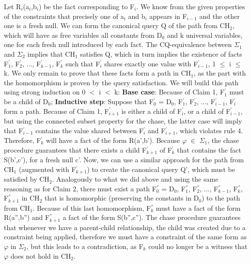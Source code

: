 \documentclass[11pt, a4paper, dvipsnames]{article}
\begin{document}
Let R$_{i}$(a$_{i}$,b$_{i}$) be the fact corresponding to F$_{i}$. We know from the given properties of the constraints that precisely one of a$_{i}$ and b$_{i}$ appears in F$_{i-1}$ and the other one is a fresh null. We can form the canonical query Q of the path from CH$_{2}$, which will have as free variables all constants from D$_{0}$ and k universal variables, one for each fresh null introduced by each fact. The CQ-equivalence between $\Sigma_{1}$ and $\Sigma_{2}$ implies that CH$_{1}$ satisfies Q, which in turn implies the existence of facts F$^{'}_{1}$, F$^{'}_{2}$, ..., F$^{'}_{k-1}$, F$^{'}_{k}$ such that F$^{'}_{i}$ shares exactly one value with F$^{'}_{i-1}$, 1 $\leq$ i $\leq$ k. We only remain to prove that these facts form a path in CH$_{1}$, as the part with the homomorphism is proven by the query satisfaction. We will build this path using strong induction on 0 $<$ i $<$ k:\newline
\textbf{Base case}: Because of Claim 1, F$^{'}_{1}$ must be a child of D$_{0}$;\newline
\textbf{Inductive step}: Suppose that F$^{'}_{0}$ = D$_{0}$, F$^{'}_{1}$, F$^{'}_{2}$, ..., F$^{'}_{i-1}$, F$^{'}_{i}$ form a path. Because of Claim 1, F$^{'}_{i+1}$ is either a child of F$^{'}_{i}$, or a child of F$^{'}_{i-1}$, but using the connected subset property for the chase, the latter case will imply that F$^{'}_{i-1}$ contains the value shared between F$^{'}_{i}$ and F$^{'}_{i+1}$, which violates rule 4.\newline
Therefore, F$^{'}_{k}$ will have a fact of the form R(a',b'). Because $\varphi$ $\in$ $\Sigma_{1}$, the chase procedure guarantees that there exists a child F$^{'}_{k+1}$ of F$^{'}_{k}$ that contains the fact S(b',c'), for a fresh null c'.\newline
Now, we can use a similar approach for the path from CH$_{1}$ (augmented with F$^{'}_{k+1}$) to create the canonical query Q', which must be satisfied by CH$_{2}$. Analogously to what we did above and using the same reasoning as for Claim 2, there must exist a path F$^{''}_{0}$ = D$_{0}$, F$^{''}_{1}$, F$^{''}_{2}$, ..., F$^{''}_{k-1}$, F$^{''}_{k}$, F$^{''}_{k+1}$ in CH$_{2}$ that is homomorphic (preserving the constants in D$_{0}$) to the path from CH$_{1}$.\newline
Because of this last homomorphism, F$^{''}_{k}$ must have a fact of the form R(a'',b'') and F$^{''}_{k+1}$ a fact of the form S(b'',c''). The chase procedure guarantees that whenever we have a parent-child relationship, the child was created due to a constraint being applied, therefore we must have a constraint of the same form as $\varphi$ in $\Sigma_{2}$, but this leads to a contradiction, as F$_{k}$ could no longer be a witness that $\varphi$ does not hold in CH$_{2}$.\newline
\end{document}
